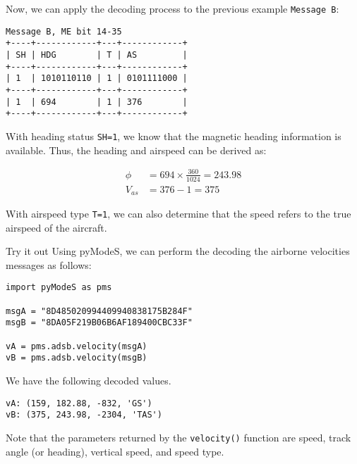 Now, we can apply the decoding process to the previous example \texttt{Message B}:

\begin{verbatim}
Message B, ME bit 14-35
+----+------------+---+------------+
| SH | HDG        | T | AS         |
+----+------------+---+------------+
| 1  | 1010110110 | 1 | 0101111000 |
+----+------------+---+------------+
| 1  | 694        | 1 | 376        |
+----+------------+---+------------+
\end{verbatim}

With heading status \texttt{SH=1}, we know that the magnetic heading information is available. Thus, the heading and airspeed can be derived as:

\begin{align}
  \phi &= 694 \times \frac{360}{1024} = 243.98 \\
  V_{as} &= 376 - 1 = 375
\end{align}

With airspeed type \texttt{T=1}, we can also determine that the speed refers to the true airspeed of the aircraft.


\begin{notebox}{Try it out}
Using pyModeS, we can perform the decoding the airborne velocities messages as follows: 

\begin{verbatim}
import pyModeS as pms

msgA = "8D485020994409940838175B284F"
msgB = "8DA05F219B06B6AF189400CBC33F"

vA = pms.adsb.velocity(msgA)
vB = pms.adsb.velocity(msgB)
\end{verbatim}

We have the following decoded values.

\begin{verbatim}
vA: (159, 182.88, -832, 'GS')
vB: (375, 243.98, -2304, 'TAS')
\end{verbatim}

Note that the parameters returned by the \texttt{velocity()} function are speed, track angle (or heading), vertical speed, and speed type.

\end{notebox}
  